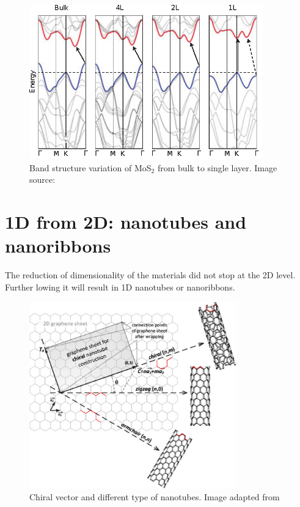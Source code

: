 \begin{figure}[htbp!] 
\centering  
\includegraphics[width=0.9\textwidth]{tmds_bands.eps}
\caption{Band structure variation of MoS$_2$ from bulk to single layer. Image source: \cite{Chhowalla2013}}  
\label{fig:tmds_bands}
\end{figure} 


\section{1D from 2D: nanotubes and nanoribbons}

The reduction of dimensionality of the materials did not stop at the 2D level. Further lowing it will result in 1D nanotubes or nanoribbons. 

\begin{figure}[htbp!] 
\centering  
\includegraphics[width=0.8\textwidth]{chiral_vector.png}
\caption{Chiral vector and different type of nanotubes. Image adapted from \cite{Prasek2011}}  
\label{fig:chiral}
\end{figure} 

